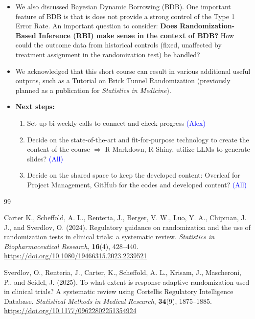 \documentclass[12pt]{article}
\begin{document}
\begin{itemize}
    It does not seem to have any mention of randomization either in the design or analysis. This may be an opportunity for us to highlight the gap. 
    \item We also discussed Bayesian Dynamic Borrowing (BDB). One important feature of BDB is that is does not provide a strong control of the Type 1 Error Rate. An important question to consider: \textbf{Does Randomization-Based Inference (RBI) make sense in the context of BDB?} How could the outcome data from historical controls (fixed, unaffected by treatment assignment in the randomization test) be handled?
    \item We acknowledged that this short course can result in various additional useful outputs, such as a Tutorial on Brick Tunnel Randomization (previously planned as a publication for \emph{Statistics in Medicine}).
    \item \textbf{Next steps:}
    \begin{enumerate}
        \item Set up bi-weekly calls to connect and check progress \textcolor{blue}{(Alex)}
        \item Decide on the state-of-the-art and fit-for-purpose technology to create the content of the course $\Rightarrow$ R Markdown, R Shiny, utilize LLMs to generate slides? \textcolor{blue}{(All)}
        \item Decide on the shared space to keep the developed content: Overleaf for Project Management, GitHub for the codes and developed content? \textcolor{blue}{(All)}
    \end{enumerate}
\end{itemize}

\begin{thebibliography}{99}

{\footnotesize

Carter K., Scheffold, A. L., Renteria, J., Berger, V. W., Luo, Y. A., Chipman, J. J., and Sverdlov, O. (2024). Regulatory guidance on randomization and the use of randomization tests in clinical trials: a systematic review. \emph{Statistics in Biopharmaceutical Research}, \textbf{16}(4), 428--440. \href{https://doi.org/10.1080/19466315.2023.2239521}{https://doi.org/10.1080/19466315.2023.2239521}

Sverdlov, O., Renteria, J., Carter, K., Scheffold, A. L., Krisam, J., Mascheroni, P., and Seidel, J. (2025). To what extent is response-adaptive randomization used in clinical trials? A systematic review using Cortellis Regulatory Intelligence Database. \emph{Statistical Methods in Medical Research}, \textbf{34}(9), 1875--1885.  \href{https://doi.org/10.1177/09622802251354924}{https://doi.org/10.1177/09622802251354924}

}

\end{thebibliography}
\end{document}
